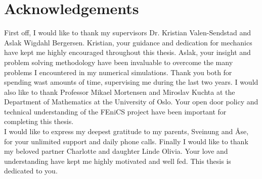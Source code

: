 \section*{Acknowledgements}


First off, I would like to thank my supervisors Dr. Kristian Valen-Sendstad and Aslak Wigdahl Bergersen. Kristian, your guidance and dedication for mechanics have kept me highly encouraged throughout this thesis. Aslak, your insight and problem solving methodology have been invaluable to overcome the many problems I encountered in my numerical simulations. Thank you both for spending wast amounts of time, supervising me during the last two years. I would also like to thank Professor Mikael Mortensen and Miroslav Kuchta at the Department of Mathematics at the University of Oslo. Your open door policy and technical understanding of the FEniCS project have been important for completing this thesis. \\

I would like to express my deepest gratitude to my parents, Sveinung and Åse, for your unlimited support and daily phone calls. Finally I would like to thank my beloved partner Charlotte and daughter Linde Olivia. Your love and understanding have kept me highly motivated and well fed. This thesis is dedicated to you.

